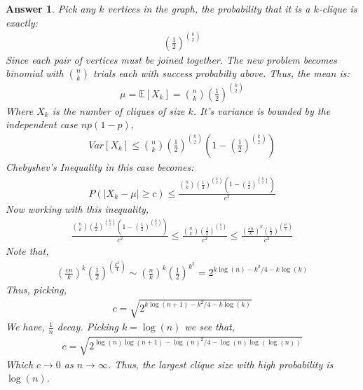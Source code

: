 \documentclass[12pt]{article}
\theoremstyle{colon}
\newtheorem*{answer}{Answer}
\begin{document}
\begin{answer}
  Pick any $k$ vertices in the graph, the probability that it is a $k$-clique is exactly:
  \begin{gather*}
    \left(\frac{1}{2} \right)^{\binom{k}{2}}
  \end{gather*}
  Since each pair of vertices must be joined together. The new problem becomes binomial with $\binom{n}{k}$ trials each with success probabilty above. Thus, the mean is:
  \begin{gather*}
    \mu = \mathbb{E}[X_k] = \binom{n}{k} \left(\frac{1}{2} \right)^{\binom{k}{2}}
  \end{gather*}
  Where $X_k$ is the number of cliques of size $k$. It's variance is bounded by the independent case $np(1-p)$,
  \begin{gather*}
    Var[X_k] \leq \binom{n}{k} \left(\frac{1}{2} \right)^{\binom{k}{2}} \left(1-\left(\frac{1}{2} \right)^{\binom{k}{2}} \right)
  \end{gather*}
  Chebyshev's Inequality in this case becomes:
  \begin{gather*}
    P(\lvert X_k-\mu \rvert \geq c) \leq \frac{\binom{n}{k} \left(\frac{1}{2} \right)^{\binom{k}{2}} \left(1-\left(\frac{1}{2} \right)^{\binom{k}{2}} \right)}{c^2}
  \end{gather*}
  Now working with this inequality,
  \begin{gather*}
    \frac{\binom{n}{k} \left(\frac{1}{2} \right)^{\binom{k}{2}} \left(1-\left(\frac{1}{2} \right)^{\binom{k}{2}} \right)}{c^2} \leq \frac{\binom{n}{k} \left(\frac{1}{2} \right)^{\binom{k}{2}}}{c^2} \leq \frac{\left( \frac{en}{k} \right)^k \left(\frac{1}{2} \right)^{\left( \frac{k^2}{4} \right)}}{c^2}
  \end{gather*}
  Note that,
  \begin{gather*}
    \left( \frac{en}{k} \right)^k \left(\frac{1}{2} \right)^{\left( \frac{k^2}{4} \right)} \sim \left( \frac{n}{k} \right)^k \left(\frac{1}{2} \right)^{k^2} = 2^{k \log(n) -k^2/4 -k \log(k)}
  \end{gather*}
  Thus, picking,
  \begin{gather*}
    c = \sqrt{2^{k \log(n+1) -k^2/4 -k \log(k)}}
  \end{gather*}
  We have, $\frac{1}{n}$ decay. Picking $k = \log(n)$ we see that,
  \begin{gather*}
    c = \sqrt{2^{\log(n) \log(n+1) -\log(n)^2/4 -\log(n) \log(\log(n))}}
  \end{gather*}
  Which $c \rightarrow 0$ as $n \rightarrow \infty$. Thus, the largest clique size with high probability is $\log(n)$.
\end{answer}
\end{document}
